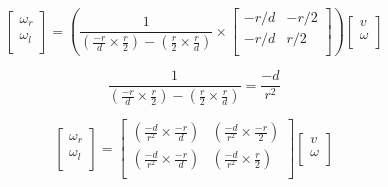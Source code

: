 $$\left[ {
    \begin{array}{cc}
        \omega_r\\
        \omega_l\\
    \end{array} } \right]  =
    \left(\frac{1}{\left(\frac{-r}{d}\times\frac{r}{2}\right)-\left(\frac{r}{2}\times\frac{r}{d}\right)}
    \times\left[ {
        \begin{array}{cc}
            -r/d & -r/2 \\
            -r/d & r/2 \\
        \end{array} }
    \right]\right)
\left[ {\begin{array}{cc}
    v \\
    \omega \\
\end{array} } \right]
$$

$$
\frac{1}{\left(\frac{-r}{d}\times\frac{r}{2}\right)-\left(\frac{r}{2}\times\frac{r}{d}\right)} = \frac{-d}{r^2}
$$

$$
\left[ {\begin{array}{cc}
    \omega_r\\
    \omega_l\\
\end{array} } \right] =
\left[ {\begin{array}{cc}
    \left(\frac{-d}{r^2} \times \frac{-r}{d}\right)& \left(\frac{-d}{r^2} \times \frac{-r}{2}\right) \\
    \left(\frac{-d}{r^2} \times \frac{-r}{d}\right) & \left(\frac{-d}{r^2} \times \frac{r}{2}\right) \\
\end{array} } \right]
\left[ {\begin{array}{cc}
    v\\
    \omega\\
\end{array} } \right]
$$

